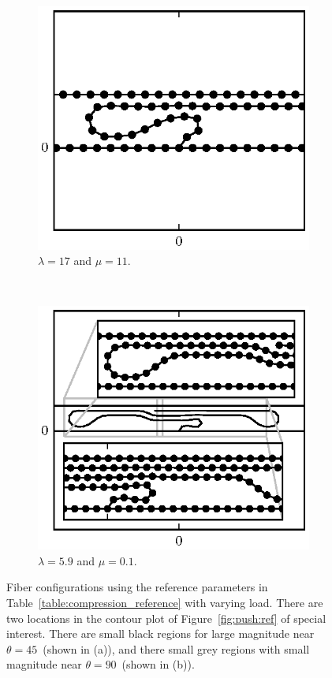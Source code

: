 	\begin{figure}[t]
		\centering
		\begin{subfigure}{.5\textwidth}
			\centering
			\includegraphics{./fig/ch3/push/ref/l17_m11.eps}
			\caption{$\lambda=17$ and $\mu=11$.\label{subfig:tight_loop}}
		\end{subfigure}%
		~
		\begin{subfigure}{.5\textwidth}
			\centering
			\includegraphics{./fig/ch3/push/ref/l5.9_m0.1.eps}
			\caption{$\lambda=5.9$ and $\mu=0.1$.\label{subfig:tight_hairpin}}
		\end{subfigure}
		\caption{Fiber configurations using the reference parameters in Table~\ref{table:compression_reference} with varying load. There are two locations in the contour plot of Figure~\ref{fig:push:ref} of special interest. There are small black regions for large magnitude near $\theta = 45$\textdegree\ (shown in (a)), and there small grey regions with small magnitude near $\theta = 90$\textdegree\ (shown in (b)).\label{fig:ref_special}}
	\end{figure}

